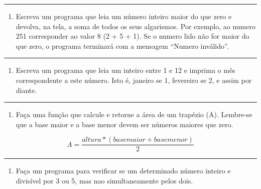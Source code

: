 \documentclass[12pt,a4paper]{article}
\renewcommand{\linethickness}{0.05em}
\providecommand{\tightlist}{%
      \setlength{\itemsep}{0pt}\setlength{\parskip}{0pt}}
\begin{document}
    \begin{center}\rule{0.5\linewidth}{\linethickness}\end{center}

\begin{enumerate}
\def\labelenumi{\arabic{enumi}.}
\setcounter{enumi}{1}
\tightlist
\item
  Escreva um programa que leia um número inteiro maior do que zero e
  devolva, na tela, a soma de todos os seus algarismos. Por exemplo, ao
  numero 251 corresponder ao valor 8 (2 + 5 + 1). Se o numero lido não
  for maior do que zero, o programa terminará com a mensagem ``Numero
  inválido''.
\end{enumerate}

    \begin{center}\rule{0.5\linewidth}{\linethickness}\end{center}

\begin{enumerate}
\def\labelenumi{\arabic{enumi}.}
\setcounter{enumi}{2}
\tightlist
\item
  Escreva um programa que leia um inteiro entre 1 e 12 e imprima o mês
  correspondente a este número. Isto é, janeiro se 1, fevereiro se 2, e
  assim por diante.
\end{enumerate}

    \begin{center}\rule{0.5\linewidth}{\linethickness}\end{center}

\begin{enumerate}
\def\labelenumi{\arabic{enumi}.}
\setcounter{enumi}{3}
\tightlist
\item
  Faça uma função que calcule e retorne a área de um trapézio (A).
  Lembre-se que a base maior e a base menor devem ser números maiores
  que zero.
\end{enumerate}

\[ A = \frac{altura*(basemaior + basemenor)}{2}\]

    \begin{center}\rule{0.5\linewidth}{\linethickness}\end{center}

\begin{enumerate}
\def\labelenumi{\arabic{enumi}.}
\setcounter{enumi}{4}
\tightlist
\item
  Faça um programa para verificar se um determinado número inteiro e
  divisível por 3 ou 5, mas nao simultaneamente pelos dois.
\end{enumerate}
\end{document}
